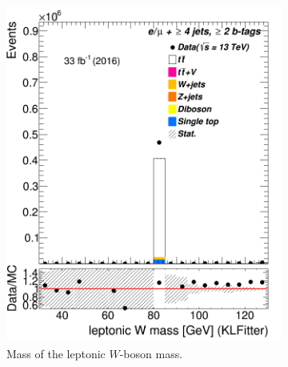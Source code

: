 \begin{figure}
\begin{subfigure}{0.35\textwidth}
		\includegraphics[width=\linewidth]{ControlPlots_emujets_2016_4incl_2incl/klf_Wlep_m_emujets_2016.png}
		\caption{Mass of the leptonic $W$-boson mass.} \label{fig:39}
	\end{subfigure}
	\hspace*{1.5cm}
	\begin{subfigure}{0.35\textwidth}

\end{subfigure}
\end{figure}
